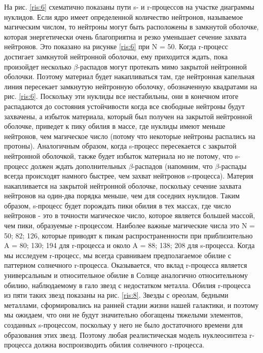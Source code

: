 \documentclass[14pt, a4paper]{article}
\numberwithin{figure}{section}
\numberwithin{equation}{section}
\begin{document}
На рис. \ref{ris:6} схематично показаны пути s- и r-процессов на участке диаграммы нуклидов. Если ядро имеет определенной количество нейтронов, называемое магическим числом, то нейтроны могут быть расположены в замкнутой оболочке, которая энергетически очень благоприятна и резко уменьшает сечение захвата нейтронов. Это показано на рисунке \ref{ris:6} при N = 50. Когда r-процесс достигает замкнутой нейтронной оболочки, ему приходится ждать, пока произойдет несколько $\beta$-распадов могут протекать мимо закрытой нейтронной оболочки. Поэтому материал будет накапливаться там, где нейтронная капельная линия пересекает замкнутую нейтронную оболочку, обозначенную квадратами на рис. \ref{ris:6}. Поскольку эти нуклиды все нестабильны, они в конечном итоге распадаются до состояния устойчивости когда все свободные нейтроны будут захвачены, а избыток материала, который был получен на закрытой нейтронной оболочке, приведет к пику обилия в массе, где нуклиды имеют меньше нейтронов, чем магическое число (потому что некоторые нейтроны распались на протоны). Аналогичным образом, когда s-процесс пересекается с закрытой нейтронной оболочкой, также будет избыток материала но не потому, что s-процесс должен ждать дополнительных $\beta$-распадов (напомним, что $\beta$-распады всегда происходят намного быстрее, чем захват нейтронов s-процесса). Материя накапливается на закрытой нейтронной оболочке, поскольку сечение захвата нейтронов на один-два порядка меньше, чем для соседних нуклидов. Таким образом, s-процесс будет порождать пики обилия в тех массах, где число нейтронов - это в точности магическое число, которое является большей массой, чем пики, образуемые r-процессом. Наиболее важные магические числа это N = 50; 82; 126, которые приводят к пикам распространенности при приблизительно A = 80; 130; 194 для r-процесса и около A = 88; 138; 208 для s-процесса. Когда мы исследуем r-процесс, мы всегда сравниваем предполагаемое обилие с паттерном солнечного r-процесса. Оказывается, что вклад r-процесса является универсальным и относительное обилие в Солнце аналогично относительному обилию, наблюдаемому в гало звезд с недостатком металла. Обилия r-процесса из пяти таких звезд показаны на рис. \ref{ris:8}. Звезды с ореолам, бедными металлами, сформировались на ранней стадии жизни нашей галактики, и поэтому мы ожидаем, что они не будут значительно обогащены тяжелыми элементов, созданных s-процессом, поскольку у него не было достаточного времени для образования этих звезд. Поэтому любая реалистическая модель нуклеосинтеза r-процесса должна воспроизводить обилия солнечного r-процесса.
\end{document}
